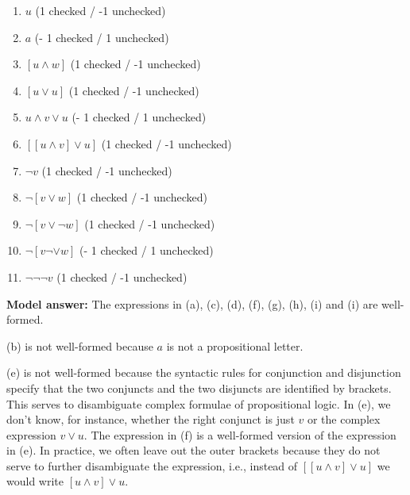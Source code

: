 \documentclass[a4,11pt]{article}
\newcommand{\6}{\mbox{$[\hspace*{-.6mm}[$}}
\newcommand{\9}{\mbox{$]\hspace*{-.6mm}]$}}
\begin{document}
\begin{enumerate}[leftmargin = 12pt]
\begin{enumerate}[noitemsep]
\item $u$ \hspace*{2cm} (1 checked / -1 unchecked)
\item $a$ \hspace*{2cm} (- 1 checked / 1 unchecked)
\item $[u \wedge w]$ \hspace*{2cm} (1 checked / -1 unchecked)
\item $[u \vee u]$ \hspace*{2cm} (1 checked / -1 unchecked)
\item $u \wedge v \vee u$ \hspace*{2cm} (- 1 checked / 1 unchecked)
\item $[[u \wedge v] \vee u]$ \hspace*{2cm} (1 checked / -1 unchecked)
\item $\neg v$ \hspace*{2cm} (1 checked / -1 unchecked)
\item $\neg [v \vee w]$ \hspace*{2cm} (1 checked / -1 unchecked)
\item $\neg [v \vee \neg w]$ \hspace*{2cm} (1 checked / -1 unchecked)
\item $\neg [v \neg \vee w]$ \hspace*{2cm} (- 1 checked / 1 unchecked)
\item $\neg \neg \neg v$ \hspace*{2cm} (1 checked / -1 unchecked)
\end{enumerate}

{\bf Model answer:} The expressions in (a), (c), (d), (f), (g), (h), (i) and (i) are well-formed.

(b) is not well-formed because $a$ is not a propositional letter. 

(e) is not well-formed because the syntactic rules for conjunction and disjunction specify that the two conjuncts and the two disjuncts are identified by brackets. This serves to disambiguate complex formulae of propositional logic. In (e), we don't know, for instance, whether the right conjunct is just $v$ or the complex expression $v \vee u$. The expression in (f) is a well-formed version of the expression in (e). In practice, we often leave out the outer brackets because they do not serve to further disambiguate the expression, i.e., instead of $[[u \wedge v] \vee u]$ we would write $[u \wedge v] \vee u$.


\end{enumerate}
\end{document}
